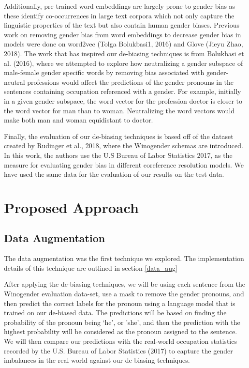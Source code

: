 \documentclass[10pt]{article}
\begin{document}
Additionally, pre-trained word embeddings are largely prone to gender bias as these identify co-occurrences in large text corpora which not only capture the linguistic properties of the text but also contain human gender biases. Previous work on removing gender bias from word embeddings to decrease gender bias in models were done on word2vec (Tolga Bolukbasi1, 2016) and Glove (Jieyu Zhao, 2018). The work that has inspired our de-biasing techniques is from Bolukbasi et al. (2016), where we attempted to explore how neutralizing a gender subspace of male-female gender specific words by removing bias associated with gender-neutral professions would affect the predictions of the gender pronouns in the sentences containing occupation referenced with a gender. For example, initially in a given gender subspace, the word vector for the profession doctor is closer to the word vector for man than to woman. Neutralizing the word vectors would make both man and woman equidistant to doctor.

Finally, the evaluation of our de-biasing techniques is based off of the dataset created by Rudinger et al., 2018, where the Winogender schemas are introduced. In this work, the authors use the U.S Bureau of Labor Statistics 2017, as the measure for evaluating gender bias in different coreference resolution models. We have used the same data for the evaluation of our results on the test data.

\section{Proposed Approach}
\subsection{Data Augmentation}
The data augmentation was the first technique we explored. The implementation details of this technique are 
outlined in section \ref{data_aug}

After applying the de-biasing techniques, we will be using each sentence from the Winogender evaluation data-set, use a mask to remove the gender pronouns, and then predict the correct labels for the pronoun using a language model that is trained on our de-biased data. The predictions will be based on finding the probability of the pronoun being
‘he’, or 'she', and then the prediction with the highest probability will be considered as the pronoun assigned to the sentence. We will then compare our predictions with the real-world occupation statistics recorded by the U.S. Bureau of Labor Statistics (2017) to capture the gender imbalances in the real-world against our de-biasing techniques.
\end{document}
